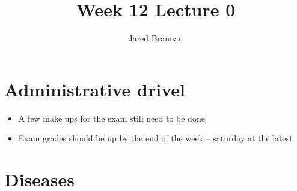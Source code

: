 \documentclass{article}
\title{Week 12 Lecture 0}
\author{Jared Brannan }
\theoremstyle{definition}
\begin{document}
\maketitle

\section{Administrative drivel}
\begin{itemize}
	\item A few make ups for the exam still need to be done
	\item Exam grades should be up by the end of the week -- saturday at the latest
\end{itemize}

\section{Diseases}
\end{document}
